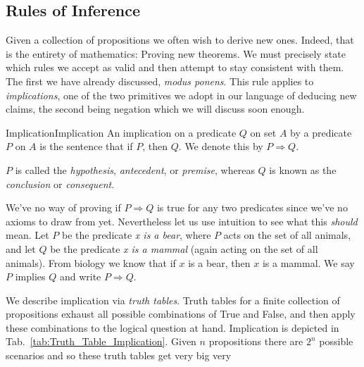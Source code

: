     \subsection{Rules of Inference}
        Given a collection of propositions we often wish to derive new ones.
        Indeed, that is the entirety of mathematics: Proving new theorems. We
        must precisely state which rules we accept as valid and then attempt to
        stay consistent with them. The first we have already discussed,
        \textit{modus ponens}. This rule applies to \textit{implications}, one
        of the two primitives we adopt in our language of deducing new claims,
        the second being negation which we will discuss soon enough.
        \begin{fdefinition}{Implication}{Implication}
            An \gls{implication} on a \gls{predicate} $Q$ on \gls{set} $A$ by a
            predicate $P$ on $A$ is the sentence that if $P$, then $Q$. We
            denote this by $P\Rightarrow{Q}$.
        \end{fdefinition}
        $P$ is called the \textit{hypothesis},
        \textit{antecedent}, or
        \textit{premise}, whereas $Q$ is known as the
        \textit{conclusion} or
        \textit{consequent}.
        \begin{example}
            \label{ex:Implication_Mammals}%
            We've no way of proving if $P\Rightarrow{Q}$ is true for any two
            predicates since we've no axioms to draw from yet. Nevertheless let
            us use intuition to see what this \textit{should} mean. Let $P$ be
            the predicate \textit{x is a bear}, where $P$ acts on the set
            of all animals, and let $Q$ be the predicate \textit{x is a mammal}
            (again acting on the set of all animals). From biology we know that
            if $x$ is a bear, then $x$ is a mammal. We say $P$ implies $Q$ and
            write $P\Rightarrow{Q}$.
        \end{example}
        We describe implication via \textit{truth tables}.
        Truth tables for a finite collection of propositions exhaust all
        possible combinations of True and False, and then apply these
        combinations to the logical question at hand. Implication is depicted in
        Tab.~\ref{tab:Truth_Table_Implication}. Given $n$ propositions there are
        $2^{n}$ possible scenarios and so these truth tables get very big very
